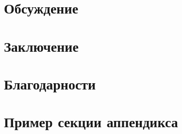 \documentclass[a4paper,12pt]{extarticle}
\begin{document}
\section{Обсуждение}

\section{Заключение}

\section{Благодарности}

\newpage 
\printbibliography[heading=bibintoc] 


\newpage
\appendix

\section{Пример секции аппендикса}
\end{document}
